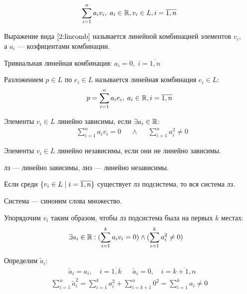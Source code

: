 \documentclass{article}
\begin{document}
\begin{align}
	\label{2:lincomb}
	\sum_{i=1}^{n}a_iv_i,\;a_i\in\mathbb{R},v_i\in L,i=\overline{1,n}
\end{align}

Выражение вида $\eqref{2:lincomb}$ называется линейной комбинацией элементов $v_i$,\\
а $a_i$ --- коэфицентами комбинации.

Тривиальная линейная комбинация: $a_i=0,\;i=\overline{1,n}$

\pagebreak


Разложением $p\in L$ по $e_i\in L$ называется линейная комбинация $e_i\in L$:
\begin{align*}
	p=\sum_{i=1}^{n}a_ie_i,\;a_i\in\mathbb{R},i=\overline{1,n}
\end{align*}


Элементы $v_i\in L$ линейно зависимы, если $\exists a_i\in\mathbb{R}$:
\begin{align*}
	 & \sum_{i=1}^{n}a_iv_i=0 &  & \land &  & \sum_{i=1}^{n}a_i^{2}\neq 0
\end{align*}

Элементы $v_i\in L$ линейно независимы, если они не линейно зависимы.

лз --- линейно зависимы, лнз --- линейно независимы.

\theorem

Если среди $\{v_i\in L\;|\;i=\overline{1,n}\}$ существует лз подсистема, то вся система лз.

Система --- синоним слова множество.

\proof

Упорядочим $v_i$ таким образом, чтобы лз подсистема была на первых $k$ местах:
\begin{align*}
	 & \exists a_i\in\mathbb{R}:(\sum_{i=1}^{k}a_iv_i=0)\land(\sum_{i=1}^{k}a_i^{2}\neq 0)
\end{align*}

\newcommand\ap{\widetilde{a}}
Определим $\ap_{i}$:
\begin{align*}
	 & \ap_{i}=a_{i},\quad i=\overline{1,k} &  & \ap_{i}=0,\quad i=\overline{k+1,n}
\end{align*}
\begin{align*}
	\sum_{i=1}^{n}\ap_{i}^{2}=\sum_{i=1}^{k}a_{i}^{2}+\sum_{i=k+1}^{n}0^{2}=\sum_{i=1}^{k}a_{i}\neq 0
\end{align*}
\end{document}
